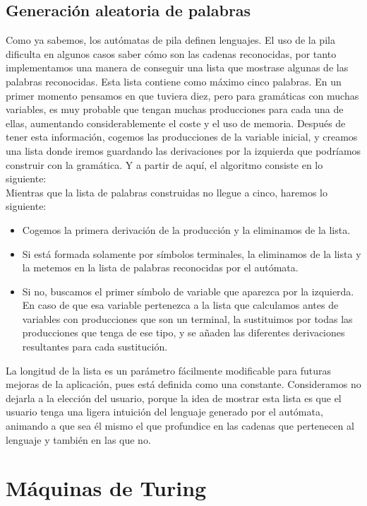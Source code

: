 \documentclass[12pt,a4paper,spanish]{book}
\begin{document}
\subsection{Generaci\'on aleatoria de palabras}
Como ya sabemos, los aut\'omatas de pila definen lenguajes. El uso de la pila dificulta en algunos casos saber c\'omo son las cadenas reconocidas, por tanto implementamos una manera de conseguir una lista que mostrase algunas de las palabras reconocidas.
Esta lista contiene como m\'aximo cinco palabras. En un primer momento pensamos en que tuviera diez, pero para gram\'aticas con muchas variables, es muy probable que tengan muchas producciones para cada una de ellas, aumentando considerablemente el coste y el uso de memoria.
Despu\'es de tener esta informaci\'on, cogemos las producciones de la variable inicial, y creamos una lista donde iremos guardando las derivaciones por la izquierda que podr\'iamos construir con la gram\'atica. Y a partir de aqu\'i, el algoritmo consiste en lo siguiente:\\
\newline
Mientras que la lista de palabras construidas no llegue a cinco, haremos lo siguiente:
\begin{itemize}
\item Cogemos la primera derivaci\'on de la producci\'on y la eliminamos de la lista.
\item Si est\'a formada solamente por s\'imbolos terminales, la eliminamos de la lista y la metemos en la lista de palabras reconocidas por el aut\'omata.
\item Si no, buscamos el primer s\'imbolo de variable que aparezca por la izquierda. En caso de que esa variable pertenezca a la lista que calculamos antes de variables con producciones que son un terminal, la sustituimos por todas las producciones que tenga de ese tipo, y se a\~naden las diferentes derivaciones resultantes para cada sustituci\'on.
\end{itemize}
La longitud de la lista es un par\'ametro f\'acilmente modificable para futuras mejoras de la aplicaci\'on, pues est\'a definida como una constante. Consideramos no dejarla a la elecci\'on del usuario, porque la idea de mostrar esta lista es que el usuario tenga una ligera intuici\'on del lenguaje generado por el aut\'omata, animando a que sea \'el mismo el que profundice en las cadenas que pertenecen al lenguaje y tambi\'en en las que no.

\newpage
\section{M\'aquinas de Turing}
\end{document}
